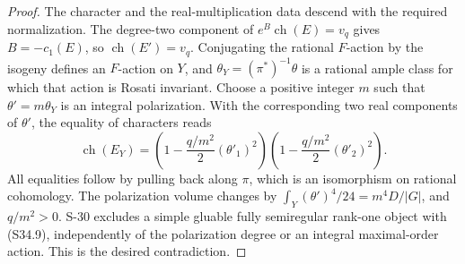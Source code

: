 \documentclass[11pt,a4paper]{article}
\theoremstyle{definition}
\begin{document}
\begin{proof}
The character and the real-multiplication data descend
with the required normalization. The degree-two component
of $e^B\operatorname{ch}(E)=v_q$ gives $B=-c_1(E)$,
so $\operatorname{ch}(E')=v_q$.
Conjugating the rational $F$-action by the isogeny
defines an $F$-action on $Y$, and
$\theta_Y=(\pi^*)^{-1}\theta$ is a rational ample class
for which that action is Rosati invariant. Choose a
positive integer $m$ such that $\theta'=m\theta_Y$
is an integral polarization. With the corresponding
two real components of $\theta'$, the equality of
characters reads
\[
 \operatorname{ch}(E_Y)
   =\left(1-\frac{q/m^2}{2}(\theta'_1)^2\right)
      \left(1-\frac{q/m^2}{2}(\theta'_2)^2\right).
 \tag{S34.9}
\]
All equalities follow by pulling back along $\pi$,
which is an isomorphism on rational cohomology. The
polarization volume changes by
$\int_Y(\theta')^4/24=m^4D/|G|$, and $q/m^2>0$.
S-30 excludes a simple gluable fully semiregular
rank-one object with (S34.9), independently of the
polarization degree or an integral maximal-order action.
This is the desired contradiction.
\end{proof}
\end{document}

